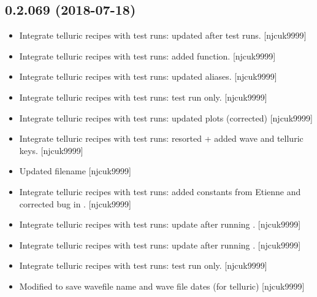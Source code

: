 \documentclass[a4paper,10pt,english]{report}
\begin{document}
\subsection{0.2.069 (2018-07-18)}
\label{\detokenize{misc/changelog:id388}}\begin{itemize}
\item {} 
Integrate telluric recipes with test runs: updated after test runs.
{[}njcuk9999{]}

\item {} 
Integrate telluric recipes with test runs: added 
function. {[}njcuk9999{]}

\item {} 
Integrate telluric recipes with test runs: updated aliases.
{[}njcuk9999{]}

\item {} 
Integrate telluric recipes with test runs: test run only. {[}njcuk9999{]}

\item {} 
Integrate telluric recipes with test runs: updated plots (corrected)
{[}njcuk9999{]}

\item {} 
Integrate telluric recipes with test runs: resorted  + added
wave and telluric keys. {[}njcuk9999{]}

\item {} 
Updated filename  {[}njcuk9999{]}

\item {} 
Integrate telluric recipes with test runs: added constants from
Etienne and corrected bug in . {[}njcuk9999{]}

\item {} 
Integrate telluric recipes with test runs: update after running
. {[}njcuk9999{]}

\item {} 
Integrate telluric recipes with test runs: update after running
. {[}njcuk9999{]}

\item {} 
Integrate telluric recipes with test runs: test run only. {[}njcuk9999{]}

\item {} 
Modified  to save wavefile name and wave file dates (for
telluric) {[}njcuk9999{]}

\end{itemize}
\end{document}
